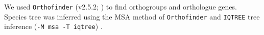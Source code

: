 \documentclass[11pt, a4paper]{article}
\begin{document}
We used \texttt{Orthofinder} (v2.5.2; \cite{Emms2015, Emms2019}) to find orthogroups and orthologue genes.
Species tree was inferred using the MSA method of \texttt{Orthofinder} and \texttt{IQTREE} tree inference (\texttt{-M msa -T iqtree}) \parencite{Emms2018, Nguyen2015}.



\end{document}
